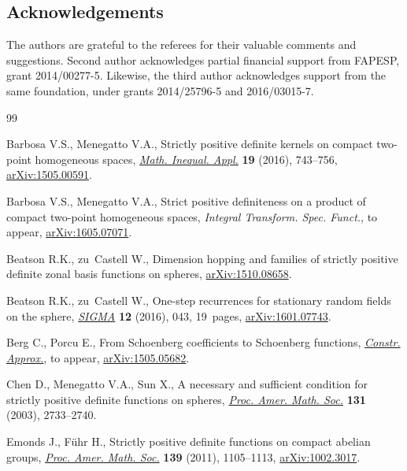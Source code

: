 \documentclass[pdftex]{sigma}
\numberwithin{equation}{section}
\begin{document}
\subsection*{Acknowledgements}

The authors are grateful to the referees for their valuable comments and suggestions. Second author acknowledges partial f\/inancial support from FAPESP, grant 2014/00277-5. Likewise, the third author acknowledges support from the same foundation, under grants 2014/25796-5 and 2016/03015-7.

\begin{thebibliography}{99}
\footnotesize\itemsep=0pt

Barbosa V.S., Menegatto V.A., Strictly positive def\/inite kernels on compact
 two-point homogeneous spaces, \href{http://dx.doi.org/10.7153/mia-19-54}{\textit{Math. Inequal. Appl.}} \textbf{19}
 (2016), 743--756, \href{http://arxiv.org/abs/1505.00591}{arXiv:1505.00591}.

Barbosa V.S., Menegatto V.A., Strict positive def\/initeness on a product of
 compact two-point homogeneous spaces, \textit{Integral Transform. Spec.
 Funct.}, {t}o appear, \href{http://arxiv.org/abs/1605.07071}{arXiv:1605.07071}.

Beatson R.K., zu~Castell W., Dimension hopping and families of strictly
 positive def\/inite zonal basis functions on spheres, \href{http://arxiv.org/abs/1510.08658}{arXiv:1510.08658}.

Beatson R.K., zu~Castell W., One-step recurrences for stationary random f\/ields
 on the sphere, \href{http://dx.doi.org/10.3842/SIGMA.2016.043}{\textit{SIGMA}} \textbf{12} (2016), 043, 19~pages,
 \href{http://arxiv.org/abs/1601.07743}{arXiv:1601.07743}.

Berg C., Porcu E., From Schoenberg coef\/f\/icients to Schoenberg functions,
 \href{http://dx.doi.org/10.1007/s00365-016-9323-9}{\textit{Constr. Approx.}}, {t}o appear, \href{http://arxiv.org/abs/1505.05682}{arXiv:1505.05682}.

Chen D., Menegatto V.A., Sun X., A necessary and suf\/f\/icient condition for
 strictly positive def\/inite functions on spheres, \href{http://dx.doi.org/10.1090/S0002-9939-03-06730-3}{\textit{Proc. Amer. Math.
 Soc.}} \textbf{131} (2003), 2733--2740.

Emonds J., F{\"u}hr H., Strictly positive def\/inite functions on compact abelian
 groups, \href{http://dx.doi.org/10.1090/S0002-9939-2010-10533-6}{\textit{Proc. Amer. Math. Soc.}} \textbf{139} (2011), 1105--1113,
 \href{http://arxiv.org/abs/1002.3017}{arXiv:1002.3017}.


\end{thebibliography}
\end{document}
